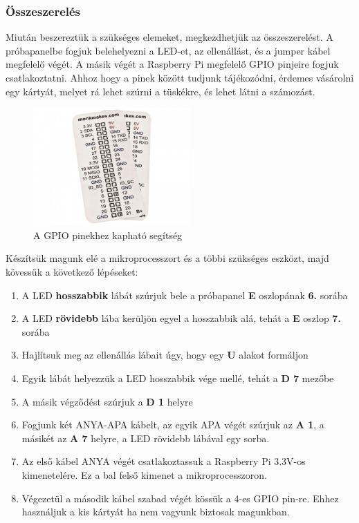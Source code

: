\documentclass[a4paper,12pt]{report}
\begin{document}
    \subsubsection{Összeszerelés}
    Miután beszereztük a szükséges elemeket, megkezdhetjük az összeszerelést. A próbapanelbe fogjuk belehelyezni a LED-et,
    az ellenállást, és a jumper kábel megfelelő végét. A másik végét a Raspberry Pi megfelelő GPIO pinjeire fogjuk csatlakoztatni.
    Ahhoz hogy a pinek között tudjunk tájékozódni, érdemes vásárolni egy kártyát, melyet rá lehet szúrni a tüskékre, és lehet látni
    a számozást.

    \begin{figure}[h!]
        \hspace{5cm}
        \includegraphics[width=6cm]{images/gpiohelper.jpg}
        \caption{A GPIO pinekhez kapható segítség}
        \label{fig: Pin segítség}
    \end{figure}

    Készítsük magunk elé a mikroprocesszort és a többi szükséges eszközt, majd kövessük a következő lépéseket:

    \begin{enumerate}
        \item A LED \textbf{hosszabbik} lábát szúrjuk bele a próbapanel \textbf{E} oszlopának \textbf{6.} sorába
        \item A LED \textbf{rövidebb} lába kerüljön egyel a hosszabbik alá, tehát a \textbf{E} oszlop \textbf{7.} sorába
        \item Hajlítsuk meg az ellenállás lábait úgy, hogy egy \textbf{U} alakot formáljon
        \item Egyik lábát helyezzük a LED hosszabbik vége mellé, tehát a \textbf{D 7} mezőbe
        \item A másik végződést szúrjuk a \textbf{D 1} helyre
        \item Fogjunk két ANYA-APA kábelt, az egyik APA végét szúrjuk az \textbf{A 1}, a másikét az \textbf{A 7} helyre, a LED
        rövidebb lábával egy sorba.
        \item Az első kábel ANYA végét csatlakoztassuk a Raspberry Pi 3.3V-os kimenetelére. Ez a bal felső kimenet a mikroprocesszoron.
        \item Végezetül a második kábel szabad végét kössük a 4-es GPIO pin-re. Ehhez használjuk a kis kártyát ha nem vagyunk biztosak
        magunkban.
    \end{enumerate}
\end{document}
